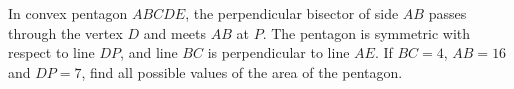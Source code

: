 In convex pentagon $ABCDE$, the perpendicular bisector of side $AB$ passes through the vertex $D$ and meets $AB$ at $P$. The pentagon is symmetric with respect to line $DP$, and line $BC$ is perpendicular to line $AE$. If $BC=4$, $AB=16$ and $DP=7$, find all possible values of the area of the pentagon.
